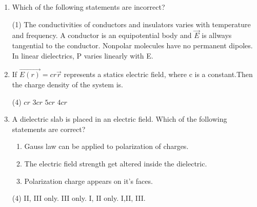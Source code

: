 \begin{enumerate} [label=\color{ocre}\textbf{\arabic*.}]
from the centre of the sphere. The electric field $\vec{E}$ at a point $\vec{r}$ outside the sphere is given
by
\begin{tasks}(2)
	\task[\textbf{a.}] $\vec{E}=0$ 
	\task[\textbf{b.}] $\vec{E}=\frac{k R\left(R^{2}-r^{2}\right)}{\varepsilon_{0} r^{3}} \hat{r}$
	\task[\textbf{c.}]  $\vec{E}=\frac{k R\left(R^{2}-r^{2}\right)}{\varepsilon_{0} r^{5}} \hat{r}$
	\task[\textbf{d.}] $\vec{E}=\frac{-k r}{\varepsilon_{0}} \hat{r}$
\end{tasks}
\item Which of the following statements are incorrect?
\begin{tasks}(1)
	\task[\textbf{a.}] The conductivities of conductors and insulators varies with temperature and frequency.
	\task[\textbf{b.}]A conductor is an equipotential body and $\vec{E}$ is allways tangential to the conductor.
	\task[\textbf{c.}] Nonpolar molecules have no permanent dipoles.
	\task[\textbf{d.}] In  linear dielectrics, P varies linearly with E.
\end{tasks}
\item If $\vec{E(r)}=cr\vec{r}$ represents a statics electric field, where c is a constant.Then the charge density of the system is.
\begin{tasks}(4)
	\task[\textbf{a.}] $cr$  
	\task[\textbf{b.}]$3cr$ 
	\task[\textbf{c.}] $5cr$ 
	\task[\textbf{d.}]  $4cr$ 
\end{tasks}
\item A dielectric slab is placed in an electric field. Which of the following statements are correct?
\begin{enumerate}[label=\Roman*.]
	\item  Gauss law can be applied to polarization of charges.
	\item The electric field strength get altered inside the dielectric.\item Polarization charge appears on it's faces.
\end{enumerate}
\begin{tasks}(4)
	\task[\textbf{a.}]II, III only.   
	\task[\textbf{b.}]III only.
	\task[\textbf{c.}]I, II only. 
	\task[\textbf{d.}]I,II, III.  
\end{tasks}
 

\end{enumerate}
